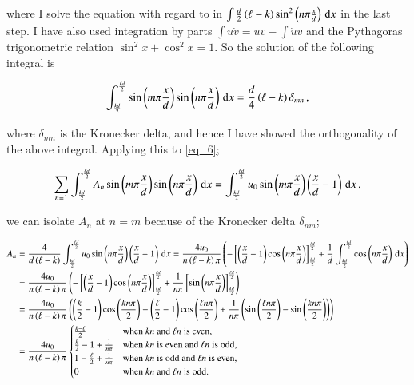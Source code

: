 \documentclass[11pt,english,a4paper]{article}
\begin{document}
\begin{flushleft}
where I solve the equation with regard to in $\int\frac{d}{2}\left({\ell-k}\right) \sin^2\left({n\pi\frac{x}{d}}\right)\,\mathrm{d}x$ in the last step. I have also used integration by parts $\int u\dot{v} = uv - \int \dot{u}v$ and the Pythagoras trigonometric relation $\sin^2 x+ \cos^2 x = 1$. So the solution of the following integral is

\begin{align*}
\int_{\frac{k d}{2}}^{\frac{\ell d}{2}} \sin\left({m\pi\frac{x}{d}}\right)\sin\left({n\pi\frac{x}{d}}\right)\,\mathrm{d}x = \frac{d}{4}\left({\ell-k}\right)\delta_{mn}\,,
\end{align*}

where $\delta_{mn}$ is the Kronecker delta, and hence I have showed the orthogonality of the above integral. Applying this to \eqref{eq_6};

\begin{align*}
\sum_{n=1}\int_{\frac{k d}{2}}^{\frac{\ell d}{2}} A_n\sin\left({m\pi\frac{x}{d}}\right)\sin\left({n\pi\frac{x}{d}}\right)\,\mathrm{d}x = \int_{\frac{k d}{2}}^{\frac{\ell d}{2}}u_0\sin\left({m\pi\frac{x}{d}}\right)\left({\frac{x}{d}-1}\right)\,\mathrm{d}x\,,
\end{align*}

we can isolate $A_n$ at $n=m$ because of the Kronecker delta $\delta_{nm}$;

\begin{align*}
A_n & = \frac{4}{d\left({\ell-k}\right)} \int_{\frac{k d}{2}}^{\frac{\ell d}{2}}u_0\sin\left({n\pi\frac{x}{d}}\right)\left({\frac{x}{d}-1}\right)\,\mathrm{d}x 
= \frac{4 u_0}{n\left({\ell-k}\right)\pi} \left({-\left[{\left({\frac{x}{d}-1}\right)\cos\left({n\pi\frac{x}{d}}\right)}\right]_{\frac{k d}{2}}^{\frac{\ell d}{2}} + \frac{1}{d}\int_{\frac{k d}{2}}^{\frac{\ell d}{2}}\cos\left({n\pi\frac{x}{d}}\right)\,\mathrm{d}x }\right)
\\
&= \frac{4 u_0}{n\left({\ell-k}\right)\pi} \left({-\left[{\left({\frac{x}{d}-1}\right)\cos\left({n\pi\frac{x}{d}}\right)}\right]_{\frac{k d}{2}}^{\frac{\ell d}{2}} + \frac{1}{n\pi} \left[{\sin\left({n\pi\frac{x}{d}}\right)}\right]_{\frac{k d}{2}}^{\frac{\ell d}{2}} }\right) 
\\
&= \frac{4 u_0}{n\left({\ell-k}\right)\pi}\left({\left({\frac{k}{2}-1}\right)\cos\left({\frac{k n\pi}{2}}\right) - \left({\frac{\ell}{2}-1}\right)\cos\left({\frac{\ell n \pi}{2}}\right) + \frac{1}{n\pi}\left({\sin\left({\frac{\ell n \pi}{2}}\right)-\sin\left({\frac{k n \pi}{2}}\right)}\right)}\right)
\\
&= \frac{4 u_0}{n\left({\ell-k}\right)\pi}\begin{cases} \frac{k-\ell}{2} & \text{when $k n$ and $\ell n$ is even,} \\ \frac{k}{2}-1 + \frac{1}{n\pi} & \text{when $k n$ is even and $\ell n$ is odd,} \\ 1-\frac{\ell}{2} + \frac{1}{n\pi} & \text{when $k n$ is odd and $\ell n$ is even,} \\ 0 & \text{when $k n$ and $\ell n$ is odd.}\end{cases}
\end{align*}


\end{flushleft}
\end{document}
